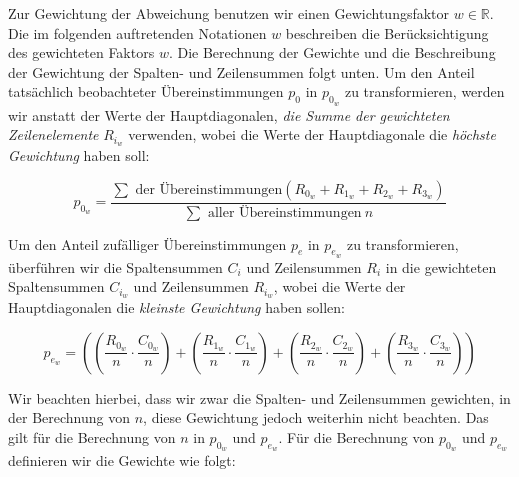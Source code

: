 Zur Gewichtung der Abweichung benutzen wir einen Gewichtungsfaktor $w \in \mathbb{R}$. Die im folgenden auftretenden Notationen $w$ beschreiben die Berücksichtigung des gewichteten Faktors $w$. Die Berechnung der Gewichte und die Beschreibung der Gewichtung der Spalten- und Zeilensummen folgt unten. Um den Anteil tatsächlich beobachteter Übereinstimmungen $p_0$ in $p_{0_{w}}$ zu transformieren, werden wir anstatt der Werte der Hauptdiagonalen, \textit{die Summe der gewichteten Zeilenelemente} $R_{i_{w}}$ verwenden, wobei die Werte der Hauptdiagonale die \textit{höchste Gewichtung} haben soll:

\vspace{-1em}
\begin{equation}	
	p_{0_{w}} = \frac{ \sum \text{ der Übereinstimmungen} \left( R_{0_{w}} + R_{1_{w}} + R_{2_{w}}+ R_{3_{w}} \right)}{ \sum \text{ aller Übereinstimmungen} \ n }
\end{equation}
\vspace{-1em}

Um den Anteil zufälliger Übereinstimmungen $p_e$ in $p_{e_{w}}$ zu transformieren, überführen wir die Spaltensummen $C_i$ und Zeilensummen $R_i$ in die gewichteten Spaltensummen $C_{i_{w}}$ und Zeilensummen $R_{i_{w}}$, wobei die Werte der Hauptdiagonalen die \textit{kleinste Gewichtung} haben sollen:

\vspace{-1em}
\begin{equation}	
	p_{e_{w}} = \left(  \left(\frac{  R_{0_{w}}}{ n } \cdot \frac{ C_{0_{w}}}{ n } \right) +   \left(\frac{  R_{1_{w}}}{ n } \cdot \frac{ C_{1_{w}}}{ n } \right) +   \left(\frac{  R_{2_{w}}}{ n } \cdot \frac{ C_{2_{w}}}{ n } \right)  +  \left(\frac{ R_{3_{w}}}{ n } \cdot \frac{ C_{3_{w}}}{ n }\right) \right)
\end{equation}
\vspace{-1em}

Wir beachten hierbei, dass wir zwar die Spalten- und Zeilensummen gewichten, in der Berechnung von $n$, diese Gewichtung jedoch weiterhin nicht beachten. Das gilt für die Berechnung von $n$ in $p_{0_{w}}$ und $p_{e_{w}}$. Für die Berechnung von $p_{0_{w}}$ und $p_{e_{w}}$ definieren wir die Gewichte wie folgt:

